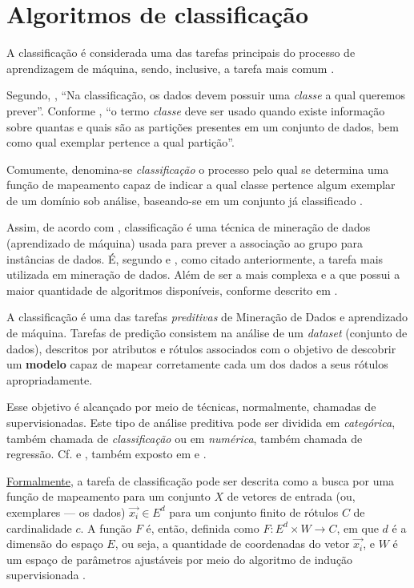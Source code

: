 \section{Algoritmos de classificação}
A classificação é considerada uma das tarefas principais do processo de aprendizagem de máquina, sendo, inclusive, a tarefa mais comum \cite{amaral_introducao_2018, fayyad1996}.

Segundo, , ``Na classificação, os dados devem possuir uma \textit{classe} a qual queremos prever''. Conforme , ``o termo \textit{classe} deve ser usado quando existe informação sobre quantas e quais são as partições presentes em um conjunto de dados, bem como qual exemplar pertence a qual partição''.

Comumente, denomina-se \textit{classificação} o processo pelo qual se determina uma função de mapeamento capaz de indicar a qual classe pertence algum exemplar de um domínio sob análise, baseando-se em um conjunto já classificado \cite{Boscarioli2017}.

Assim, de acordo com , classificação é uma técnica de mineração de dados (aprendizado de máquina) usada para prever a associação ao grupo para instâncias de dados. É, segundo  e , como citado anteriormente, a tarefa mais utilizada em mineração de dados. Além de ser a mais complexa e a que possui a maior quantidade de algoritmos disponíveis, conforme descrito em .

A classificação é uma das tarefas \textit{preditivas} de Mineração de Dados e aprendizado de máquina. Tarefas de predição consistem na análise de um \textit{dataset} (conjunto de dados), descritos por atributos e rótulos associados com o objetivo de descobrir um \textbf{modelo} capaz de mapear corretamente cada um dos dados a seus rótulos apropriadamente. 

Esse objetivo é alcançado por meio de técnicas, normalmente, chamadas de supervisionadas. Este tipo de análise preditiva pode ser dividida em \textit{categórica}, também chamada de \textit{classificação} ou em \textit{numérica}, também chamada de regressão. Cf.   e , também exposto em  e .

\underline{Formalmente}, a tarefa de classificação pode ser descrita como a busca por uma função de mapeamento para um conjunto $X$ de vetores de entrada (ou, exemplares --- os dados) $\vec{x_i} \in E^d$ para um conjunto finito de rótulos $C$ de cardinalidade $c$. A função $F$ é, então, definida como $F: E^d \times W \rightarrow C$, em que $d$ é a dimensão do espaço $E$, ou seja, a quantidade de coordenadas do vetor $\vec{x_i}$, e $W$ é um espaço de parâmetros ajustáveis por meio do algoritmo de indução supervisionada \cite{Boscarioli2017}.

